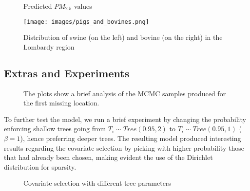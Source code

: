 \documentclass[11pt,a4paper]{article}
\begin{document}

\begin{figure}[h]
    \centering
    \hfill
    \caption{Predicted $PM_{2.5}$ values}
    \label{fig:Comp_Milan}
\end{figure}

\begin{figure}[H]
    \centering
    \texttt{[image: images/pigs\_and\_bovines.png]}
    \caption{Distribution of swine (on the left) and bovine (on the right) in the Lombardy region}
    \label{fig:pigs_bovines}
\end{figure}

\subsection{Extras and Experiments}
\begin{figure}[h]
    \centering
    \hfill
    \caption{The plots show a brief analysis of the MCMC samples produced for the first missing location.}
    \label{fig:MCMC_posterior_plots}
\end{figure}

To further test the model, we run a brief experiment by changing the probability enforcing shallow trees going from $T_i \sim Tree(0.95, 2)$ to $T_i \sim Tree(0.95, 1)$ ($\beta = 1$), hence preferring deeper trees. The resulting model produced interesting results regarding the covariate selection by picking with higher probability those that had already been chosen, making evident the use of the Dirichlet distribution for sparsity.

\begin{figure}[h]
    \centering
    \hfill
    \caption{Covariate selection with different tree parameters}
    \label{fig:cov_sel_tree_depths}
\end{figure}
\end{document}
